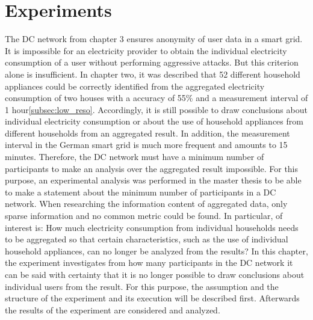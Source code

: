 \chapter{Experiments}
\label{sec:experiments}


The DC network from chapter 3 ensures anonymity of user data in a smart grid. It is impossible for an electricity provider to obtain the individual electricity consumption of a user without performing aggressive attacks. But this criterion alone is insufficient. In chapter two, it was described that 52 different household appliances could be correctly identified from the aggregated electricity consumption of two houses with a accuracy of 55\% and a measurement interval of 1 hour\ref{subsec:low_reso}. Accordingly, it is still possible to draw conclusions about individual electricity consumption or about the use of household appliances from different households from an aggregated result. In addition, the measurement interval in the German smart grid is much more frequent and amounts to 15 minutes. Therefore, the DC network must have a minimum number of participants to make an analysis over the aggregated result impossible. For this purpose, an experimental analysis was performed in the master thesis to be able to make a statement about the minimum number of participants in a DC network. When researching the information content of aggregated data, only sparse information and no common metric could be found. In particular, of interest is: How much electricity consumption from individual households needs to be aggregated so that certain characteristics, such as the use of individual household appliances, can no longer be analyzed from the results? In this chapter, the experiment investigates from how many participants in the DC network it can be said with certainty that it is no longer possible to draw conclusions about individual users from the result. For this purpose, the assumption and the structure of the experiment and its execution will be described first. Afterwards the results of the experiment are considered and analyzed.
